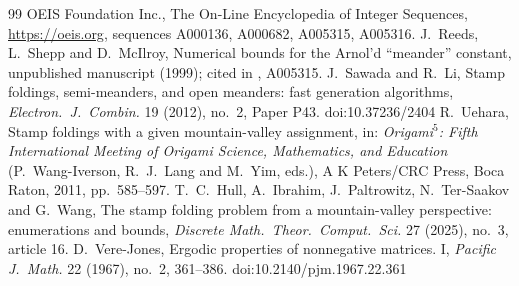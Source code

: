 \documentclass[11pt]{amsart}
\theoremstyle{definition}
\begin{document}
\begin{thebibliography}{99}
 OEIS Foundation Inc., The On-Line Encyclopedia of Integer Sequences, \url{https://oeis.org}, sequences A000136, A000682, A005315, A005316.
 J.~Reeds, L.~Shepp and D.~McIlroy, Numerical bounds for the Arnol'd ``meander'' constant, unpublished manuscript (1999); cited in \cite{OEIS}, A005315.
 J.~Sawada and R.~Li, Stamp foldings, semi-meanders, and open meanders: fast generation algorithms, \emph{Electron.\ J.\ Combin.} 19 (2012), no.~2, Paper P43. doi:10.37236/2404
 R.~Uehara, Stamp foldings with a given mountain-valley assignment, in: \emph{Origami$^5$: Fifth International Meeting of Origami Science, Mathematics, and Education} (P.~Wang-Iverson, R.~J.~Lang and M.~Yim, eds.), A K Peters/CRC Press, Boca Raton, 2011, pp.~585--597.
 T.~C.~Hull, A.~Ibrahim, J.~Paltrowitz, N.~Ter-Saakov and G.~Wang, The stamp folding problem from a mountain-valley perspective: enumerations and bounds, \emph{Discrete Math.\ Theor.\ Comput.\ Sci.} 27 (2025), no.~3, article 16.
 D.~Vere-Jones, Ergodic properties of nonnegative matrices. I, \emph{Pacific J.\ Math.} 22 (1967), no.~2, 361--386. doi:10.2140/pjm.1967.22.361
\end{thebibliography}
\end{document}

